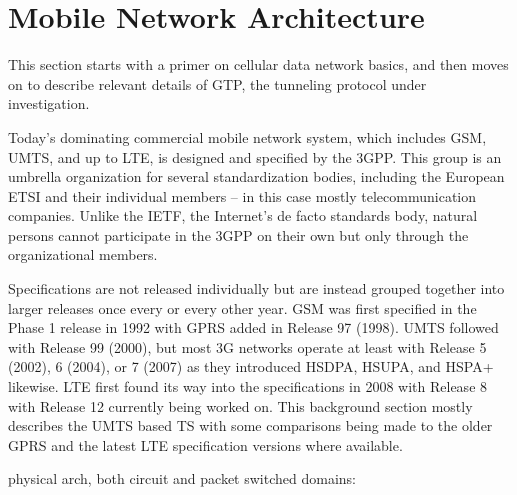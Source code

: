 \section{Mobile Network Architecture}
\label{c4:3gpparchitecture}

This section starts with a primer on cellular data network basics, and then moves on to describe relevant details of \gls{GTP}, the tunneling protocol under investigation.


Today's dominating commercial mobile network system, which includes \gls{GSM}, \gls{UMTS}, and up to \gls{LTE}, is designed and specified by the \gls{3GPP}. This group is an umbrella organization for several standardization bodies, including the European \gls{ETSI} and their individual members -- in this case mostly telecommunication companies. Unlike the \gls{IETF}, the Internet's de facto standards body, natural persons cannot participate in the \gls{3GPP} on their own but only through the organizational members.

Specifications are not released individually but are instead grouped together into larger releases once every or every other year. \gls{GSM} was first specified in the Phase 1 release in 1992 with \gls{GPRS} added in Release 97 (1998). \gls{UMTS} followed with Release 99 (2000), but most 3G networks operate at least with Release 5 (2002), 6 (2004), or 7 (2007) as they introduced \gls{HSDPA}, \gls{HSUPA}, and \gls{HSPA+} likewise. \gls{LTE} first found its way into the specifications in 2008 with Release 8 with Release 12 currently being worked on. This background section mostly describes the \gls{UMTS} based \gls{TS} with some comparisons being made to the older \gls{GPRS} and the latest \gls{LTE} specification versions where available.

 
physical arch, both circuit and packet switched domains: \cite{3gpp.23.002}

